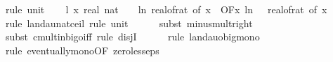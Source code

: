 \begin{isabellebody}
\ {\isacharparenleft}{\kern0pt}rule\ unit{\isacharunderscore}{\kern0pt}{}{\isacharparenright}{\kern0pt}\isanewline
\isanewline
\ \ \isamarkupfalse%
\ l{}{\isacharcolon}{\kern0pt}\ {\isachardoublequoteopen}{\isacharparenleft}{\kern0pt}{\isasymlambda}x{\isachardot}{\kern0pt}\ real\ {\isacharparenleft}{\kern0pt}nat\ {\isasymlceil}{\isacharminus}{\kern0pt}\ {\isacharparenleft}{\kern0pt}{}{}\ {\isacharasterisk}{\kern0pt}\ ln\ {\isacharparenleft}{\kern0pt}real{\isacharunderscore}{\kern0pt}of{\isacharunderscore}{\kern0pt}rat\ {\isacharparenleft}{\kern0pt}{\isasymepsilon}{\isacharunderscore}{\kern0pt}of\ x{\isacharparenright}{\kern0pt}{\isacharparenright}{\kern0pt}{\isacharparenright}{\kern0pt}{\isasymrceil}{\isacharparenright}{\kern0pt}{\isacharparenright}{\kern0pt}\ {\isasymin}\ O{\isacharbrackleft}{\kern0pt}{\isacharquery}{\kern0pt}F{\isacharbrackright}{\kern0pt}{\isacharparenleft}{\kern0pt}{\isasymlambda}x{\isachardot}{\kern0pt}\ ln\ {\isacharparenleft}{\kern0pt}{}\ {\isacharslash}{\kern0pt}\ real{\isacharunderscore}{\kern0pt}of{\isacharunderscore}{\kern0pt}rat\ {\isacharparenleft}{\kern0pt}{\isasymepsilon}{\isacharunderscore}{\kern0pt}of\ x{\isacharparenright}{\kern0pt}{\isacharparenright}{\kern0pt}{\isacharparenright}{\kern0pt}{\isachardoublequoteclose}\isanewline
\ \ \ \ \isamarkupfalse%
\ {\isacharparenleft}{\kern0pt}rule\ landau{\isacharunderscore}{\kern0pt}nat{\isacharunderscore}{\kern0pt}ceil{\isacharcomma}{\kern0pt}\ rule\ unit{\isacharunderscore}{\kern0pt}{}{\isacharparenright}{\kern0pt}\isanewline
\ \ \ \ \isamarkupfalse%
\ {\isacharparenleft}{\kern0pt}subst\ minus{\isacharunderscore}{\kern0pt}mult{\isacharunderscore}{\kern0pt}right{\isacharparenright}{\kern0pt}\isanewline
\ \ \ \ \isamarkupfalse%
\ {\isacharparenleft}{\kern0pt}subst\ cmult{\isacharunderscore}{\kern0pt}in{\isacharunderscore}{\kern0pt}bigo{\isacharunderscore}{\kern0pt}iff{\isacharcomma}{\kern0pt}\ rule\ disjI{}{\isacharparenright}{\kern0pt}\isanewline
\ \ \ \ \isamarkupfalse%
\ {\isacharparenleft}{\kern0pt}rule\ landau{\isacharunderscore}{\kern0pt}o{\isachardot}{\kern0pt}big{\isacharunderscore}{\kern0pt}mono{\isacharparenright}{\kern0pt}\isanewline
\ \ \ \ \isamarkupfalse%
\ {\isacharparenleft}{\kern0pt}rule\ eventually{\isacharunderscore}{\kern0pt}mono{\isacharbrackleft}{\kern0pt}OF\ zero{\isacharunderscore}{\kern0pt}less{\isacharunderscore}{\kern0pt}eps{\isacharbrackright}{\kern0pt}{\isacharparenright}{\kern0pt}\isanewline

\end{isabellebody}
